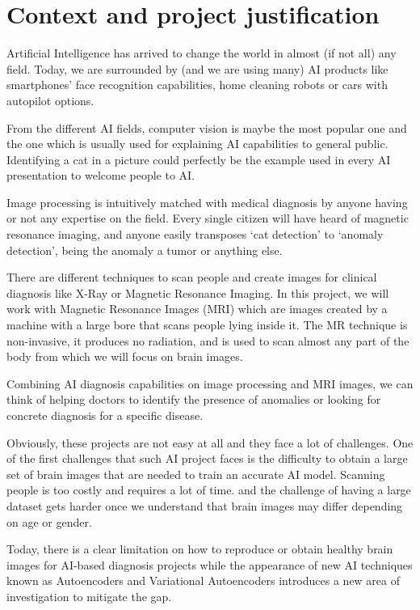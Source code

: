 \section{Context and project justification}

Artificial Intelligence has arrived to change the world in almost (if not all) any field. Today, we are surrounded by (and we are using many) AI products like smartphones’ face recognition capabilities, home cleaning robots or cars with autopilot options.

From the different AI fields, computer vision is maybe the most popular one and the one which is usually used for explaining AI capabilities to general public. Identifying a cat in a picture could perfectly be the example used in every AI presentation to welcome people to AI.

Image processing is intuitively matched with medical diagnosis by anyone having or not any expertise on the field. Every single citizen will have heard of magnetic resonance imaging, and anyone easily transposes ‘cat detection’ to ‘anomaly detection’, being the anomaly a tumor or anything else.

There are different techniques to scan people and create images for clinical diagnosis like X-Ray or Magnetic Resonance Imaging. In this project, we will work with Magnetic Resonance Images (MRI) which are images created by a machine with a large bore that scans people lying inside it. The MR technique is non-invasive, it produces no radiation, and is used to scan almost any part of the body from which we will focus on brain images.

Combining AI diagnosis capabilities on image processing and MRI images, we can think of helping doctors to identify the presence of anomalies or looking for concrete diagnosis for a specific disease.

Obviously, these projects are not easy at all and they face a lot of challenges. One of the first challenges that such AI project faces is the difficulty to obtain a large set of brain images that are needed to train an accurate AI model. Scanning people is too costly and requires a lot of time. and the challenge of having a large dataset gets harder once we understand that brain images may differ depending on age or gender.

Today, there is a clear limitation on how to reproduce or obtain healthy brain images for AI-based diagnosis projects while the appearance of new AI techniques known as Autoencoders and Variational Autoencoders introduces a new area of investigation to mitigate the gap.

